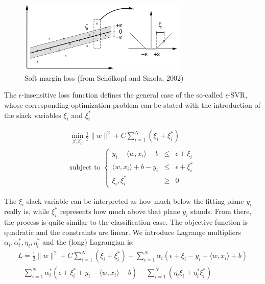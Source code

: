 \documentclass{article}
\begin{document}
\begin{figure}
\begin{center}
\includegraphics[width=8cm]{../img/epsilon_insensitive2.png}
\end{center}
\caption{Soft margin loss (from Sch\"olkopf and Smola, 2002)}
\label{fig:loss}
\end{figure}

The $\epsilon$-insensitive loss function defines the general case of the so-called $\epsilon$-SVR, whose corresponding optimization problem can be stated with the introduction of the slack variables $\xi_i$ and $\xi_i^*$

\begin{gather*}
\min\limits_{\beta,\beta_0} \frac{1}{2} \|w\|^2 + C \sum\limits_{i=1}^N \left(\xi_i + \xi_i^*\right)\\
\text{subject to }\left\{\begin{array}{rcl}
y_i-\langle w, x_i\rangle - b &\leq & \epsilon+\xi_i\\
\langle w, x_i\rangle +b -y_i &\leq & \epsilon +\xi_i^*\\
\xi_i, \xi_i^* & \geq & 0
\end{array}\right.
\end{gather*}

The $\xi_i$ slack variable can be interpreted as how much below the fitting plane $y_i$ really is, while $\xi_i^*$ represents how much above that plane $y_i$ stands. From there, the process is quite similar to the classification case. The objective function is quadratic and the constraints are linear. We introduce Lagrange multipliers $\alpha_i, \alpha_i^*, \eta_i, \eta_i^*$ and the (long) Lagrangian is:
\begin{multline*}
L = \frac{1}{2} \|w\|^2 + C \sum\limits_{i=1}^N \left(\xi_i + \xi_i^*\right)  - \sum\limits_{i=1}^N \alpha_i\left(\epsilon + \xi_i - y_i + \langle w, x_i\rangle + b\right)\\
-\sum\limits_{i=1}^N \alpha^*_i\left(\epsilon + \xi^*_i + y_i - \langle w, x_i\rangle - b\right) - \sum\limits_{i=1}^N \left(\eta_i\xi_i + \eta^*_i\xi^*_i\right)
\end{multline*}
\end{document}
